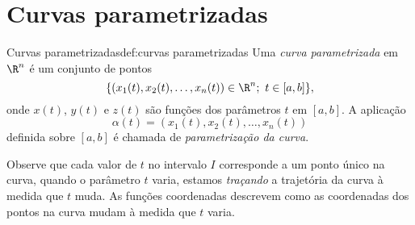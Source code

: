 
\newpage





\section{Curvas parametrizadas}

\begin{definition}{Curvas parametrizadas}{def:curvas parametrizadas}
Uma \textit{curva parametrizada} em $\R^n$ é um conjunto de pontos 
\[\{(x_1(t),x_2(t),\dots,x_n(t))\in\R^n;~t\in[a,b]\},\] 
onde \(x(t)\), \(y(t)\) e \(z(t)\) são funções dos parâmetros \(t\) em $[a,b]$. A aplicação 
$$\alpha(t)=(x_1(t),x_2(t),\dots,x_n(t))$$
definida sobre $[a,b]$ é chamada de \textit{parametrização da curva}\footnotemark.
\end{definition}


Observe que cada valor de \(t\) no intervalo \(I\) corresponde a um ponto único na curva, quando o parâmetro \(t\) varia, estamos \textit{traçando} a trajetória da curva à medida que \(t\) muda. As funções coordenadas descrevem como as coordenadas dos pontos na curva mudam à medida que \(t\) varia.

